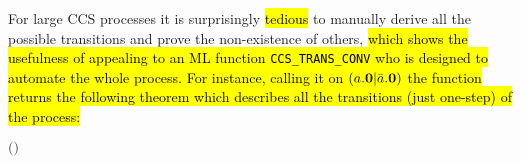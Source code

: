 For large CCS processes it is surprisingly \hl{tedious} to manually derive
all the possible transitions and prove the non-existence of others,
\hl{which shows the usefulness of appealing to an ML function
\texttt{CCS\_TRANS\_CONV} who is designed to automate the whole process.
For instance, calling it on $(a.{\boldsymbol 0} | \bar{a}.{\boldsymbol 0})$ the function returns the
following theorem which describes all the transitions (just one-step) of the process:}
\begin{alltt}
\HOLTokenTurnstile{} \HOLConst{\HOLTokenInputAct} \HOLSymConst{\ensuremath{\ldotp}} \HOLSymConst{\ensuremath{\mid}} \HOLConst{\HOLTokenOutputAct} \HOLSymConst{\ensuremath{\ldotp}} \HOLTokenTransBegin{}\HOLTokenTransEnd {} \HOLSymConst{\HOLTokenEquiv{}}
   \ensuremath{(} \HOLSymConst{\ensuremath{=}} \HOLConst{\HOLTokenInputAct}  \HOLSymConst{\HOLTokenConj{}}  \HOLSymConst{\ensuremath{=}}  \HOLSymConst{\ensuremath{\mid}} \HOLConst{\HOLTokenOutputAct} \HOLSymConst{\ensuremath{\ldotp}} \HOLSymConst{\HOLTokenDisj{}}  \HOLSymConst{\ensuremath{=}} \HOLConst{\HOLTokenOutputAct}  \HOLSymConst{\HOLTokenConj{}}  \HOLSymConst{\ensuremath{=}} \HOLConst{\HOLTokenInputAct} \HOLSymConst{\ensuremath{\ldotp}} \HOLSymConst{\ensuremath{\mid}} \ensuremath{)} \HOLSymConst{\HOLTokenDisj{}}
    \HOLSymConst{\ensuremath{=}} \HOLSymConst{\ensuremath{\tau}} \HOLSymConst{\HOLTokenConj{}}  \HOLSymConst{\ensuremath{=}}  \HOLSymConst{\ensuremath{\mid}} 
\end{alltt}

